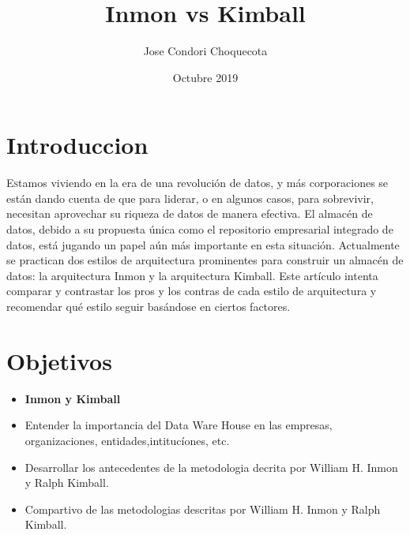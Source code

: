 \documentclass[twoside,twocolumn]{article}
\title{Inmon vs Kimball}
\author{Jose Condori Choquecota\\
}
\date{Octubre 2019}
\begin{document}
\maketitle


\section{Introduccion}
\lettrine[nindent=0em,lines=3]{E}stamos viviendo en la era de una revolución de datos, y más corporaciones se están dando cuenta de que para liderar, o en algunos casos, para sobrevivir, necesitan aprovechar su riqueza de datos de manera efectiva. El almacén de datos, debido a su propuesta única como el repositorio empresarial integrado de datos, está jugando un papel aún más importante en esta situación. Actualmente se practican dos estilos de arquitectura prominentes para construir un almacén de datos: la arquitectura Inmon y la arquitectura Kimball. Este artículo intenta comparar y contrastar los pros y los contras de cada estilo de arquitectura y recomendar qué estilo seguir basándose en ciertos factores.






\section{Objetivos}

\begin{itemize}

\item \textbf{ Inmon y Kimball}
\\
\item Entender la importancia del Data Ware House en las empresas, organizaciones, entidades,intitucíones, etc.
\item Desarrollar los antecedentes de la metodologia decrita por William H. Inmon y Ralph Kimball.
\item Compartivo de las metodologias descritas por William H. Inmon y Ralph Kimball.
\\



\end{itemize}
\end{document}
